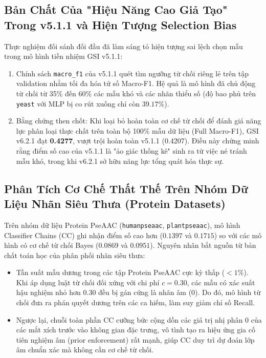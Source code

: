 \documentclass[10pt,a4paper,twoside]{article}
\begin{document}
\subsection{Bản Chất Của "Hiệu Năng Cao Giả Tạo" Trong v5.1.1 và Hiện Tượng Selection Bias}
Thực nghiệm đối sánh đối đầu đã làm sáng tỏ hiện tượng sai lệch chọn mẫu trong mô hình tiền nhiệm GSI v5.1.1:
\begin{enumerate}[leftmargin=*]
    \item Chính sách \texttt{macro\_f1} của v5.1.1 quét tìm ngưỡng từ chối riêng lẻ trên tập validation nhằm tối đa hóa tử số Macro-F1. Hệ quả là mô hình đã chủ động từ chối từ 35\% đến 60\% các mẫu khó và các nhãn thiểu số (độ bao phủ trên \texttt{yeast} với MLP bị co rút xuống chỉ còn $39.17\%$).
    \item Bằng chứng then chốt: Khi loại bỏ hoàn toàn cơ chế từ chối để đánh giá năng lực phân loại thực chất trên toàn bộ 100\% mẫu dữ liệu (Full Macro-F1), GSI v6.2.1 đạt \textbf{0.4277}, vượt trội hoàn toàn v5.1.1 (0.4207). Điều này chứng minh rằng điểm số cao của v5.1.1 là "ảo giác thống kê" sinh ra từ việc né tránh mẫu khó, trong khi v6.2.1 sở hữu năng lực tổng quát hóa thực sự.
\end{enumerate}

\subsection{Phân Tích Cơ Chế Thất Thế Trên Nhóm Dữ Liệu Nhãn Siêu Thưa (Protein Datasets)}
Trên nhóm dữ liệu Protein PseAAC (\texttt{humanpseaac}, \texttt{plantpseaac}), mô hình Classifier Chains (CC) ghi nhận điểm số cao hơn ($0.1397$ và $0.1715$) so với các mô hình có cơ chế từ chối Bayes ($0.0869$ và $0.0951$). Nguyên nhân bắt nguồn từ bản chất toán học của phân phối nhãn siêu thưa:
\begin{itemize}[leftmargin=*]
    \item Tần suất mẫu dương trong các tập Protein PseAAC cực kỳ thấp ($< 1\%$). Khi áp dụng luật từ chối đối xứng với chi phí $c = 0.30$, các mẫu có xác suất hậu nghiệm nhỏ hơn $0.30$ đều bị gán cứng là nhãn âm (0). Do đó, mô hình từ chối đưa ra phán quyết dương trên các ca hiếm, làm suy giảm chỉ số Recall.
    \item Ngược lại, chuỗi toàn phần CC cưỡng bức cộng dồn các giá trị nhị phân 0 của các mắt xích trước vào không gian đặc trưng, vô tình tạo ra hiệu ứng gia cố tiên nghiệm âm (prior enforcement) rất mạnh, giúp CC duy trì dự đoán lớp âm chuẩn xác mà không cần cơ chế từ chối.
\end{itemize}
\end{document}
